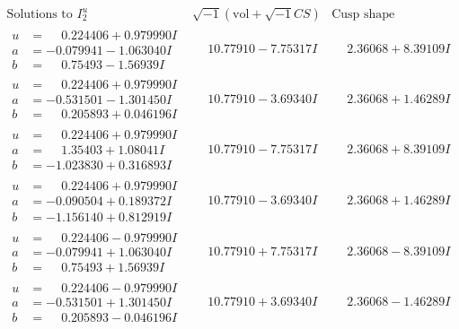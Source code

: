 \documentclass[1p]{elsarticle_modified}
\theoremstyle{definition}
\newcommand{\I}{\sqrt{-1}}
\begin{document}
$$\begin{array}{c|c|c}  
\text{Solutions to }I^u_{2}& \I (\text{vol} + \sqrt{-1}CS) & \text{Cusp shape}\\
 \hline 
\begin{aligned}
u &= \phantom{-}0.224406 + 0.979990 I \\
a &= -0.079941 - 1.063040 I \\
b &= \phantom{-}0.75493 - 1.56939 I\end{aligned}
 & \phantom{-}10.77910 - 7.75317 I & \phantom{-}2.36068 + 8.39109 I \\ \hline\begin{aligned}
u &= \phantom{-}0.224406 + 0.979990 I \\
a &= -0.531501 - 1.301450 I \\
b &= \phantom{-}0.205893 + 0.046196 I\end{aligned}
 & \phantom{-}10.77910 - 3.69340 I & \phantom{-}2.36068 + 1.46289 I \\ \hline\begin{aligned}
u &= \phantom{-}0.224406 + 0.979990 I \\
a &= \phantom{-}1.35403 + 1.08041 I \\
b &= -1.023830 + 0.316893 I\end{aligned}
 & \phantom{-}10.77910 - 7.75317 I & \phantom{-}2.36068 + 8.39109 I \\ \hline\begin{aligned}
u &= \phantom{-}0.224406 + 0.979990 I \\
a &= -0.090504 + 0.189372 I \\
b &= -1.156140 + 0.812919 I\end{aligned}
 & \phantom{-}10.77910 - 3.69340 I & \phantom{-}2.36068 + 1.46289 I \\ \hline\begin{aligned}
u &= \phantom{-}0.224406 - 0.979990 I \\
a &= -0.079941 + 1.063040 I \\
b &= \phantom{-}0.75493 + 1.56939 I\end{aligned}
 & \phantom{-}10.77910 + 7.75317 I & \phantom{-}2.36068 - 8.39109 I \\ \hline\begin{aligned}
u &= \phantom{-}0.224406 - 0.979990 I \\
a &= -0.531501 + 1.301450 I \\
b &= \phantom{-}0.205893 - 0.046196 I\end{aligned}
 & \phantom{-}10.77910 + 3.69340 I & \phantom{-}2.36068 - 1.46289 I \\ \hline\begin{aligned}

\end{aligned}
\end{array}$$
\end{document}
